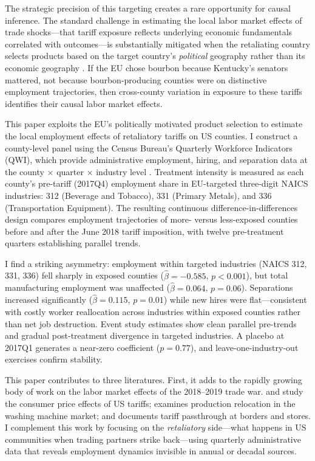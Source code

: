 \documentclass[12pt]{article}
\begin{document}
The strategic precision of this targeting creates a rare opportunity for causal inference. The standard challenge in estimating the local labor market effects of trade shocks---that tariff exposure reflects underlying economic fundamentals correlated with outcomes---is substantially mitigated when the retaliating country selects products based on the target country's \textit{political} geography rather than its economic geography \citep{fajgelbaum2020return, autor2013china}. If the EU chose bourbon because Kentucky's senators mattered, not because bourbon-producing counties were on distinctive employment trajectories, then cross-county variation in exposure to these tariffs identifies their causal labor market effects.

This paper exploits the EU's politically motivated product selection to estimate the local employment effects of retaliatory tariffs on US counties. I construct a county-level panel using the Census Bureau's Quarterly Workforce Indicators (QWI), which provide administrative employment, hiring, and separation data at the county $\times$ quarter $\times$ industry level \citep{abowd2009lehd}. Treatment intensity is measured as each county's pre-tariff (2017Q4) employment share in EU-targeted three-digit NAICS industries: 312 (Beverage and Tobacco), 331 (Primary Metals), and 336 (Transportation Equipment). The resulting continuous difference-in-differences design compares employment trajectories of more- versus less-exposed counties before and after the June 2018 tariff imposition, with twelve pre-treatment quarters establishing parallel trends.

I find a striking asymmetry: employment within targeted industries (NAICS 312, 331, 336) fell sharply in exposed counties ($\hat{\beta} = -0.585$, $p < 0.001$), but total manufacturing employment was unaffected ($\hat{\beta} = 0.064$, $p = 0.06$). Separations increased significantly ($\hat{\beta} = 0.115$, $p = 0.01$) while new hires were flat---consistent with costly worker reallocation across industries within exposed counties rather than net job destruction. Event study estimates show clean parallel pre-trends and gradual post-treatment divergence in targeted industries. A placebo at 2017Q1 generates a near-zero coefficient ($p = 0.77$), and leave-one-industry-out exercises confirm stability.

This paper contributes to three literatures. First, it adds to the rapidly growing body of work on the labor market effects of the 2018--2019 trade war. \citet{fajgelbaum2020return} and \citet{amiti2019impact} study the consumer price effects of US tariffs; \citet{flaaen2020production} examines production relocation in the washing machine market; and \citet{cavallo2021tariff} documents tariff passthrough at borders and stores. I complement this work by focusing on the \textit{retaliatory} side---what happens in US communities when trading partners strike back---using quarterly administrative data that reveals employment dynamics invisible in annual or decadal sources.
\end{document}
